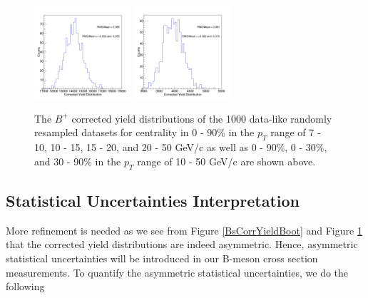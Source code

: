 \begin{figure}[h]
\begin{center}
\includegraphics[width= 0.32\textwidth]{Figures/Chapter5/BPCorrYield_0_30_10-50_Assym.png}
\includegraphics[width= 0.32\textwidth]{Figures/Chapter5/BPCorrYield_30_90_10-50_Assym.png}  
\caption{The $B^+$ corrected yield distributions of the 1000 data-like randomly resampled datasets for centrality in 0 - 90\% in the $p_T$ range of 7 - 10, 10 - 15, 15 - 20, and 20 - 50 GeV/c as well as 0 - 90\%, 0 - 30\%, and 30 - 90\% in the $p_T$ range of 10 - 50 GeV/c are shown above.} 
\label{BPCorrYieldBoot} 
\end{center}
\end{figure}

\clearpage

\subsection{Statistical Uncertainties Interpretation}

More refinement is needed as we see from Figure \ref{BsCorrYieldBoot} and Figure \ref{BPCorrYieldBoot} that the corrected yield distributions are indeed asymmetric. Hence, asymmetric statistical uncertainties will be introduced in our B-meson cross section measurements. To quantify the asymmetric statistical uncertainties, we do the following


